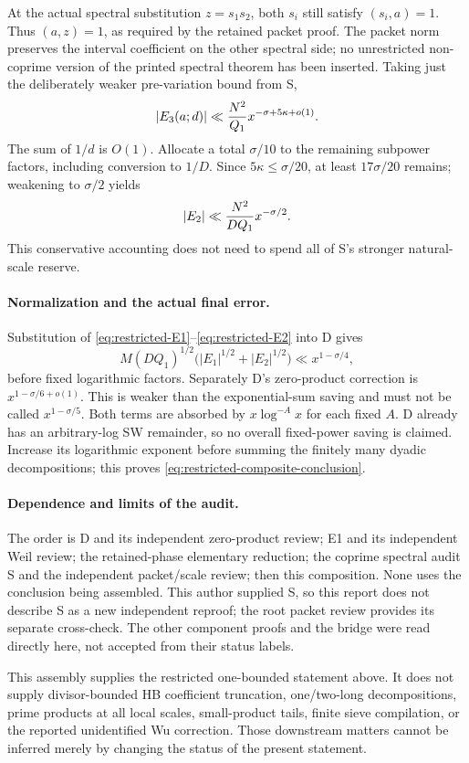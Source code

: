 At the actual spectral substitution $z=s_1s_2$, both $s_i$ still
satisfy $(s_i,a)=1$.  Thus $(a,z)=1$, as required by the retained
packet proof.  The packet norm preserves the interval coefficient
on the other spectral side; no unrestricted non-coprime version
of the printed spectral theorem has been inserted.
Taking just the deliberately weaker pre-variation bound from S,
\[
 |E_3(a;d)|\ll {N^2\over Q_1}x^{-\sigma+5\kappa+o(1)}.
\]
The sum of $1/d$ is $O(1)$.  Allocate a total $\sigma/10$ to
the remaining subpower factors, including conversion to $1/D$.
Since $5\kappa\leq\sigma/20$, at least $17\sigma/20$ remains;
weakening to $\sigma/2$ yields
\begin{equation}\label{eq:restricted-E2}
 |E_2|\ll {N^2\over DQ_1}x^{-\sigma/2}.
\end{equation}
This conservative accounting does not need to spend all of S's
stronger natural-scale reserve.

\paragraph{Normalization and the actual final error.}
Substitution of \eqref{eq:restricted-E1}--\eqref{eq:restricted-E2}
into D gives
\[
 M(DQ_1)^{1/2}\bigl(|E_1|^{1/2}+|E_2|^{1/2}\bigr)
 \ll x^{1-\sigma/4},
\]
before fixed logarithmic factors.  Separately D's zero-product
correction is $x^{1-\sigma/6+o(1)}$.  This is weaker than the
exponential-sum saving and must not be called $x^{1-\sigma/5}$.
Both terms are absorbed by $x\log^{-A}x$ for each fixed $A$.
D already has an arbitrary-log SW remainder, so no overall
fixed-power saving is claimed.  Increase its logarithmic exponent
before summing the finitely many dyadic decompositions; this proves
\eqref{eq:restricted-composite-conclusion}.

\paragraph{Dependence and limits of the audit.}
The order is D and its independent zero-product review; E1 and its
independent Weil review; the retained-phase elementary reduction;
the coprime spectral audit S and the independent packet/scale review;
then this composition.  None uses the conclusion being assembled.
This author supplied S, so this report does not describe S as a new
independent reproof; the root packet review provides its separate
cross-check.  The other component proofs and the bridge were read
directly here, not accepted from their status labels.

This assembly supplies the restricted one-bounded statement above.
It does not supply divisor-bounded HB coefficient truncation,
one/two-long decompositions, prime products at all local scales,
small-product tails, finite sieve compilation, or the reported
unidentified Wu correction.  Those downstream matters cannot be
inferred merely by changing the status of the present statement.
